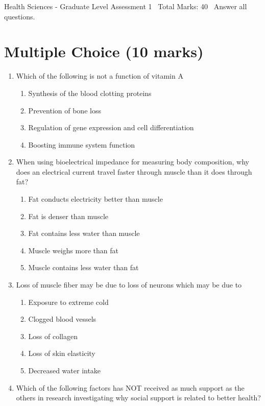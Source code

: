 \documentclass[12pt]{article}
\begin{document}
\begin{center}
Health Sciences - Graduate Level Assessment 1 \
Total Marks: 40 \
Answer all questions.
\end{center}

\section*{Multiple Choice (10 marks)}
\begin{enumerate}[label=\arabic*.]
\item Which of the following is not a function of vitamin A
\begin{enumerate}[label=(\alph*)]
    \item Synthesis of the blood clotting proteins
    \item Prevention of bone loss
    \item Regulation of gene expression and cell differentiation
    \item Boosting immune system function
\end{enumerate}
\item When using bioelectrical impedance for measuring body composition, why does an electrical current travel faster through muscle than it does through fat?
\begin{enumerate}[label=(\alph*)]
    \item Fat conducts electricity better than muscle
    \item Fat is denser than muscle
    \item Fat contains less water than muscle
    \item Muscle weighs more than fat
    \item Muscle contains less water than fat
\end{enumerate}
\item Loss of muscle fiber may be due to loss of neurons which may be due to
\begin{enumerate}[label=(\alph*)]
    \item Exposure to extreme cold
    \item Clogged blood vessels
    \item Loss of collagen
    \item Loss of skin elasticity
    \item Decreased water intake
\end{enumerate}
\item Which of the following factors has NOT received as much support as the others in research investigating why social support is related to better health?

\end{enumerate}
\end{document}
